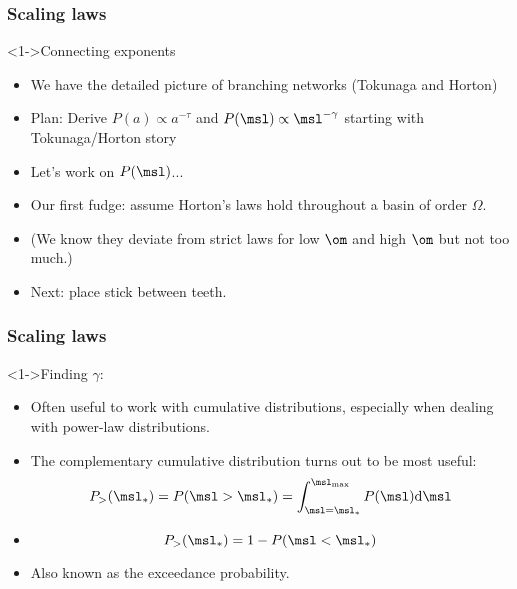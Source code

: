 \begin{frame}[label=]
  \frametitle{Scaling laws}

  \begin{block}<1->{Connecting exponents}
    \begin{itemize}
    \item<2-> We have the detailed picture of branching networks (Tokunaga and
      Horton)
    \item<3-> Plan: Derive $P(a) \propto a^{-\tau}$ and $P(\msl) \propto \msl^{-\gamma}$
      starting with Tokunaga/Horton story\cite{tarboton1990a,devries1994a,dodds1999a}
    \item<4-> Let's work on $P(\msl)$...
    \item<5-> Our first fudge: assume Horton's laws hold throughout a basin of
      order $\Omega$.
    \item<6-> (We know they deviate from strict laws for low $\om$ and high $\om$
      but not too much.)
    \item<7-> Next: place stick between teeth.  
    \end{itemize}
  \end{block}
\end{frame}

\begin{frame}[label=]
  \frametitle{Scaling laws}

  \begin{block}<1->{Finding $\gamma$:}
    \begin{itemize}
    \item<2-> Often useful to work with \alert{cumulative distributions},
      especially when dealing with power-law distributions.
    \item<3-> The complementary cumulative distribution turns out
      to be most useful:
      $$
      P_> (\msl_\ast) = 
      P (\msl > \msl_\ast) =
      \int_{\msl=\msl_{\ast}}^{\msl_{\max}} P(\msl) {\textnormal{d}}{\msl}
      $$
    \item<4->
      $$
      P_> (\msl_\ast) =  1 - P(\msl < \msl_\ast)
      $$
    \item<5-> Also known as the exceedance probability.
    \end{itemize}
  \end{block}

\end{frame}

